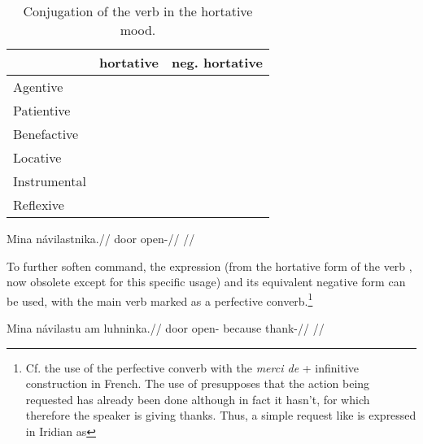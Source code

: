 \begin{table}
    \footnotesize\sffamily
		\caption{Conjugation of the verb  in the hortative mood.}
		\label{tbl:hortative}
    \begin{tabu}to 0.7\textwidth{YYY}
         \toprule

         &{\sc hortative}&{\sc neg. hortative}  \\
         \midrule
         Agentive &
          &
         \\

         Patientive &
          &
         \\

         Benefactive &
          &
         \\

         Locative &
          &
         \\

         Instrumental &
          &
         \\

         Reflexive &
          &
         \\

         \bottomrule
    \end{tabu}

\end{table}

\pex
\begingl
\gla Mina návilastnika.//
\glb door open-//
\glft {}//
\endgl
\xe

To further soften command, the expression  (from the hortative
form of the verb , now obsolete except for this
specific usage) and its equivalent negative form  can be used,
with the main verb marked as a perfective converb.\footnote{Cf. the use of the perfective converb with the \textit{merci de} + infinitive construction in French. The use of  presupposes that the action being requested has already been done although in fact it hasn't, for which therefore the speaker is giving thanks. Thus, a simple request like  is expressed in Iridian as }

\pex
\begingl
\gla Mina návilastu am luhninka.//
\glb door open- because thank-//
\glft {}//
\endgl
\xe

